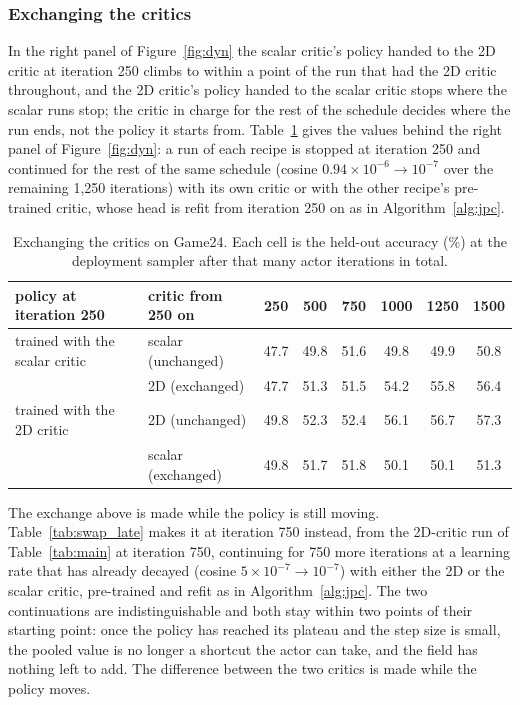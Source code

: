 \fi


\iffalse
\subsubsection{Exchanging the critics}
\label{app:swap_late}
In the right panel of Figure~\ref{fig:dyn} the scalar critic's policy handed to the 2D critic at iteration 250 climbs to within a point of the run that had the 2D critic throughout, and the 2D critic's policy handed to the scalar critic stops where the scalar runs stop; the critic in charge for the rest of the schedule decides where the run ends, not the policy it starts from.
Table~\ref{tab:swap} gives the values behind the right panel of Figure~\ref{fig:dyn}: a run of each recipe is stopped at iteration 250 and continued for the rest of the same schedule (cosine $0.94\times10^{-6}\to10^{-7}$ over the remaining 1{,}250 iterations) with its own critic or with the other recipe's pre-trained critic, whose head is refit from iteration 250 on as in Algorithm~\ref{alg:jpc}. \begin{table}[H]\centering\small
\caption{Exchanging the critics on Game24. Each cell is the held-out accuracy (\%) at the deployment sampler after that many actor iterations in total.}\label{tab:swap}
\begin{tabular}{@{}llcccccc@{}}\toprule
policy at iteration 250 & critic from 250 on & 250 & 500 & 750 & 1000 & 1250 & 1500 \\\midrule
trained with the scalar critic & scalar (unchanged) & 47.7 & 49.8 & 51.6 & 49.8 & 49.9 & 50.8 \\
 & 2D (exchanged) & 47.7 & 51.3 & 51.5 & 54.2 & 55.8 & 56.4 \\\midrule
trained with the 2D critic & 2D (unchanged) & 49.8 & 52.3 & 52.4 & 56.1 & 56.7 & 57.3 \\
 & scalar (exchanged) & 49.8 & 51.7 & 51.8 & 50.1 & 50.1 & 51.3 \\
\bottomrule\end{tabular}\end{table}
The exchange above is made while the policy is still moving. Table~\ref{tab:swap_late} makes it at iteration 750 instead, from the 2D-critic run of Table~\ref{tab:main} at iteration 750, continuing for 750 more iterations at a learning rate that has already decayed (cosine $5\times10^{-7}\to10^{-7}$) with either the 2D or the scalar critic, pre-trained and refit as in Algorithm~\ref{alg:jpc}. The two continuations are indistinguishable and both stay within two points of their starting point: once the policy has reached its plateau and the step size is small, the pooled value is no longer a shortcut the actor can take, and the field has nothing left to add. The difference between the two critics is made while the policy moves.
